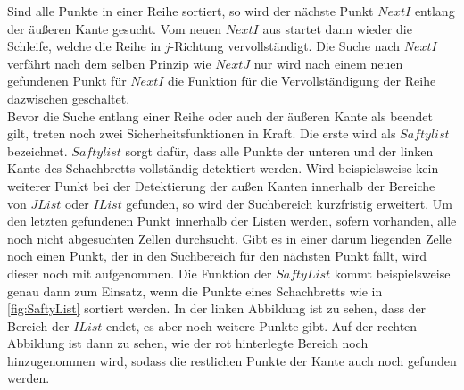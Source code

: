 Sind alle Punkte in einer Reihe sortiert, so wird der nächste Punkt $NextI$ entlang der äußeren Kante gesucht. Vom neuen $NextI$ aus startet dann wieder die Schleife, welche die Reihe in $j$-Richtung vervollständigt. Die Suche nach $NextI$ verfährt nach dem selben Prinzip wie $NextJ$ nur wird nach einem neuen gefundenen Punkt für $NextI$ die Funktion für die Vervollständigung der Reihe dazwischen geschaltet.\\

Bevor die Suche entlang einer Reihe oder auch der äußeren Kante als beendet gilt, treten noch zwei Sicherheitsfunktionen in Kraft. Die erste wird als $Saftylist$ bezeichnet. $Saftylist$ sorgt dafür, dass alle Punkte der unteren und der linken Kante des Schachbretts vollständig detektiert werden. Wird beispielsweise kein weiterer Punkt bei der Detektierung der außen Kanten innerhalb der Bereiche von $JList$ oder $IList$ gefunden, so wird der Suchbereich kurzfristig erweitert. Um den letzten gefundenen Punkt innerhalb der Listen werden, sofern vorhanden, alle noch nicht abgesuchten Zellen durchsucht. Gibt es in einer darum liegenden Zelle noch einen Punkt, der in den Suchbereich für den nächsten Punkt fällt, wird dieser noch mit aufgenommen. Die Funktion der $SaftyList$ kommt beispielsweise genau dann zum Einsatz, wenn die Punkte eines Schachbretts wie in \ref{fig:SaftyList} sortiert werden. In der linken Abbildung ist zu sehen, dass der Bereich der $IList$ endet, es aber noch weitere Punkte gibt. Auf der rechten Abbildung ist dann zu sehen, wie der rot hinterlegte Bereich noch hinzugenommen wird, sodass die restlichen Punkte der Kante auch noch gefunden werden.\\


